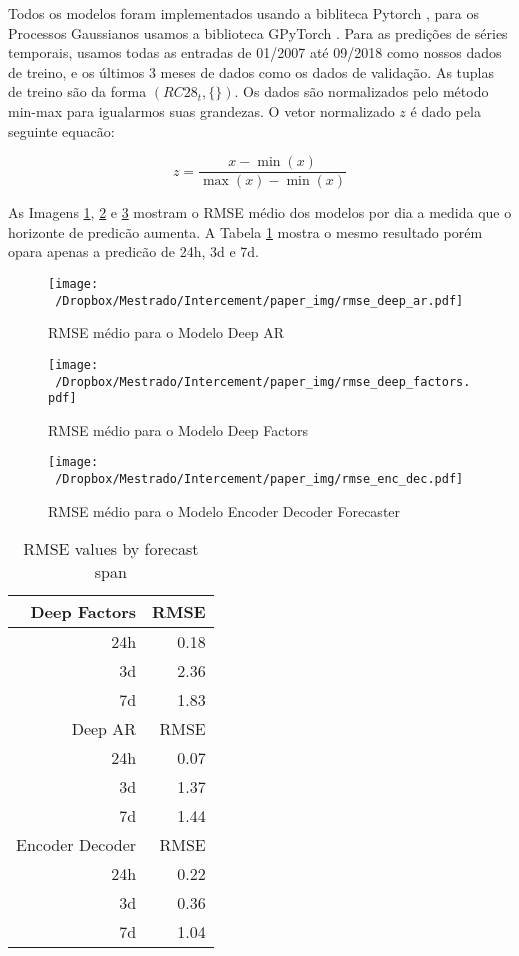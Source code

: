 Todos os modelos foram implementados usando a bibliteca Pytorch \cite{pytorch}, para os Processos Gaussianos usamos a biblioteca GPyTorch \cite{gpytorch}. Para as predições de séries temporais, usamos todas as entradas de 01/2007 até 09/2018 como nossos dados de treino, e os últimos 3 meses de dados como os dados de validação. As tuplas de treino são da forma $(RC28_{t},\{\})$. Os dados são normalizados pelo método min-max para igualarmos suas grandezas. O vetor normalizado $z$ é dado pela seguinte equacão:  


\begin{equation}
z=\frac{x-\min (x)}{\max (x)-\min (x)}
\end{equation}


As Imagens \ref{fig:rmsedeepar}, \ref{fig:rmsedeepfactors} e \ref{fig:rmseencdec} mostram o RMSE médio dos modelos por dia a medida que o horizonte de predicão aumenta. A Tabela \ref{tab:rmse} mostra o mesmo resultado porém opara apenas a predicão de 24h, 3d e 7d. \\



\begin{figure}[H]
  \centering
\texttt{[image: ~/Dropbox/Mestrado/Intercement/paper\_img/rmse\_deep\_ar.pdf]} 
\caption{RMSE médio para o Modelo Deep AR}
  \label{fig:rmsedeepar}
\end{figure}
\begin{figure}[H]
  \centering
\texttt{[image: ~/Dropbox/Mestrado/Intercement/paper\_img/rmse\_deep\_factors.pdf]} 
\caption{RMSE médio para o Modelo Deep Factors}
  \label{fig:rmsedeepfactors}
\end{figure}
\begin{figure}[H]
  \centering
\texttt{[image: ~/Dropbox/Mestrado/Intercement/paper\_img/rmse\_enc\_dec.pdf]} 
\caption{RMSE médio para o Modelo Encoder Decoder Forecaster}
  \label{fig:rmseencdec}
\end{figure}


\begin{center}
\begin{table}[htbp]
\caption{\label{tab:rmse}
RMSE values by forecast span}
\centering
\begin{tabular}{rr}
\hline
Deep Factors & RMSE\\
\hline
24h & 0.18\\
3d & 2.36\\
7d & 1.83\\
\hline
Deep AR & RMSE\\
\hline
24h & 0.07\\
3d & 1.37\\
7d & 1.44\\
\hline
Encoder Decoder & RMSE\\
\hline
24h & 0.22\\
3d & 0.36\\
7d & 1.04\\
\end{tabular}
\end{table}
\end{center}


